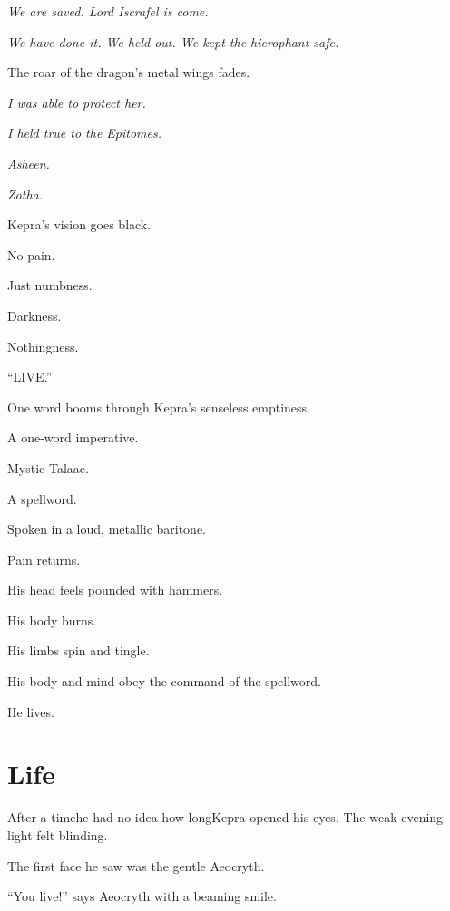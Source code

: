 \documentclass
  [a4paper,
   12pt,
   oneside
  ]%
  {article}
\newcommand{\sectionbreak}{\bigskip\noindent}
\begin{document}
\emph{We are saved. Lord Iscrafel is come.}

\emph{We have done it. We held out. We kept the hierophant safe.}

The roar of the dragon’s metal wings fades. 

\emph{I was able to protect her.}

\emph{I held true to the Epitomes.}

\emph{Asheen.}

\emph{Zotha.}

Kepra’s vision goes black. 

No pain. 

Just numbness. 

Darkness.

Nothingness.



\sectionbreak
{\Large{``{LIVE.}''}}


\sectionbreak
One word booms through Kepra’s senseless emptiness. 

A one-word imperative.

Mystic Talaac.

A spellword.

Spoken in a loud, metallic baritone. 

Pain returns. 

His head feels pounded with hammers. 

His body burns. 

His limbs spin and tingle. %

His body and mind obey the command of the spellword. 

He lives.



\section{Life}

After a time\dash{}he had no idea how long\dash{}Kepra opened his eyes. 
The weak evening light felt blinding. 

The first face he saw was the gentle Aeocryth. 

``You live!'' says Aeocryth with a beaming smile. 
\end{document}
